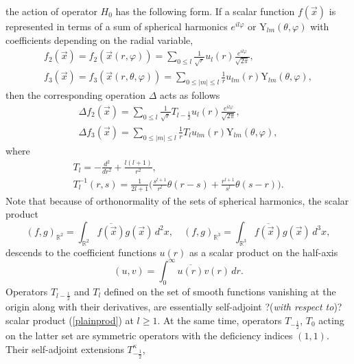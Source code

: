 \documentclass[12pt]{article}
\newcommand{\ol}{\overline}
\newcommand{\RR}{\mathbb{R}}
\newcommand{\YY}{\mathrm{Y}}
\begin{document}
	the action of operator
$ H_{0} $
	has the following form.
	If a scalar function
$ f(\vec{x}) $
	is represented in terms of a sum of spherical harmonics
$ e^{il\varphi} $ or
$ \YY_{lm}(\theta,\varphi) $
	with coefficients depending on the radial variable,
\begin{gather*}
    f_{2}(\vec{x}) = f_{2}(\vec{x}(r,\varphi)) = \sum_{0\leq l}
    \frac{1}{\sqrt{r}} u_{l}(r)
        \frac{e^{il\varphi}}{\sqrt{2\pi}} , \\
    f_{3}(\vec{x}) = f_{3}(\vec{x}(r,\theta,\varphi)) = \sum_{0\leq |m| \leq l}
    \frac{1}{r} u_{lm}(r)
        \YY_{lm}(\theta,\varphi) , 
\end{gather*}
	then the corresponding operation
$ \Delta $
	acts as follows
\begin{gather*}
    \Delta f_{2}(\vec{x})
        = \sum_{0\leq l} \frac{1}{\sqrt{r}}T_{l-\frac{1}{2}} u_{l}(r)
	    \frac{e^{il\varphi}}{\sqrt{2\pi}} , \\
    \Delta f_{3}(\vec{x})
        = \sum_{0\leq |m| \leq l} \frac{1}{r}T_{l} u_{lm}(r)
	\YY_{lm}(\theta,\varphi) ,
\end{gather*}
	where
\begin{gather}
\label{Tl}
    T_{l} = -\frac{d^{2}}{dr^{2}} + \frac{l(l+1)}{r^{2}} ,\\
\nonumber
    T_{l}^{-1}(r,s) = \frac{1}{2l+1}\bigl(\frac{s^{l+1}}{r^{l}} \theta(r-s)
	+ \frac{r^{l+1}}{s^{l}}\theta(s-r)\bigr).
\end{gather}
	Note that because of orthonormality of the sets of spherical
	harmonics, the scalar product
\begin{equation*}
    (f,g)_{\RR^{2}} = \int_{\RR^{2}} \ol{f(\vec{x})} g(\vec{x}) \,d^{2}x ,
\quad
    (f,g)_{\RR^{3}} = \int_{\RR^{3}} \ol{f(\vec{x})} g(\vec{x}) \,d^{3}x ,
\end{equation*}
	descends to the coefficient functions
$ u(r) $
	as a scalar product on the half-axis
\begin{equation}
\label{plainprod}
    (u,v) = \int_{0}^{\infty} \ol{u(r)} v(r) \, dr .
\end{equation}
	Operators
$ T_{l-\frac{1}{2}} $ and
$ T_{l} $
	defined on the set of smooth functions vanishing at the origin
	along with their derivatives,
	are essentially self-adjoint ?({\it with respect to})? scalar product
(\ref{plainprod})
	at
$ l \geq 1 $.
	At the same time, operators
$ T_{-\frac{1}{2}} $,
$ T_{0} $
	acting on the latter set are symmetric operators with the deficiency indices
$ (1,1) $.
	Their self-adjoint extensions
$ T_{-\frac{1}{2}}^{\kappa} $,
\end{document}
